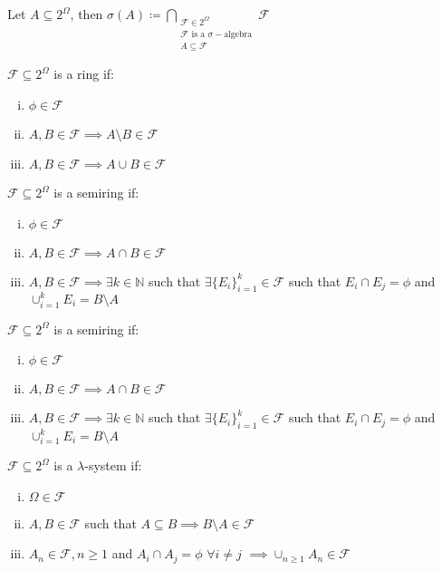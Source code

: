 \begin{definition}
	Let $A \subseteq 2^\Omega$, then $\displaystyle \sigma(A) \coloneqq \bigcap_{\substack{\mathcal F \in 2^\Omega \\ \mathcal F \text{ is a }\sigma-\text{algebra} \\ A \subseteq \mathcal F}} \mathcal F$
\end{definition}

\begin{definition}[Ring]
	$\mathcal F \subseteq 2^\Omega$ is a ring if:
	\begin{enumerate}[i)]
		\item $\phi \in \mathcal F$
		\item $A,B \in \mathcal F \implies A \setminus B \in \mathcal F$
		\item $A,B \in \mathcal F \implies A \cup B \in \mathcal F$
	\end{enumerate}
\end{definition}

\begin{definition}[Semiring]
	$\mathcal F \subseteq 2^\Omega$ is a semiring if:
	\begin{enumerate}[i)]
		\item $\phi \in \mathcal F$
		\item $A,B \in \mathcal F \implies A \cap B \in \mathcal F$
		\item $A,B \in \mathcal F \implies \exists k \in \mathbb{N}$ such that $\exists \{E_i\}_{i=1}^k \in \mathcal F$ such that $E_i \cap E_j = \phi$ and $\cup_{i=1}^k E_i = B \setminus A$
	\end{enumerate}
\end{definition}

\begin{definition}[Semiring]
	$\mathcal F \subseteq 2^\Omega$ is a semiring if:
	\begin{enumerate}[i)]
		\item $\phi \in \mathcal F$
		\item $A,B \in \mathcal F \implies A \cap B \in \mathcal F$
		\item $A,B \in \mathcal F \implies \exists k \in \mathbb{N}$ such that $\exists \{E_i\}_{i=1}^k \in \mathcal F$ such that $E_i \cap E_j = \phi$ and $\cup_{i=1}^k E_i = B \setminus A$
	\end{enumerate}
\end{definition}

\begin{definition}
	$\mathcal F \subseteq 2^\Omega$ is a $\lambda$-system if:
	\begin{enumerate}[i)]
		\item $\Omega \in \mathcal F$
		\item $A,B \in \mathcal F$ such that $A \subseteq B \implies B \setminus A \in \mathcal F$
		\item $A_n \in \mathcal F, n \geq 1$ and $A_i \cap A_j = \phi$ $\forall i \neq j$ $\implies \cup_{n \geq 1} A_n \in \mathcal F$
	\end{enumerate}
\end{definition}

